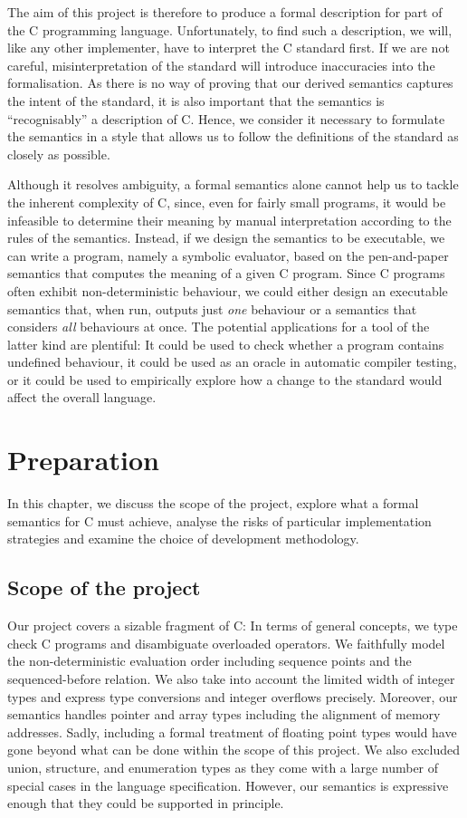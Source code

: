 \documentclass[a4paper,12pt]{scrbook}
\theoremstyle{plain}
\theoremstyle{definition}
\begin{document}
The aim of this project is therefore to produce a formal description for part of
the C programming language. Unfortunately, to find such a description, we will,
like any other implementer, have to interpret the C standard first. If we are
not careful, misinterpretation of the standard will introduce inaccuracies into
the formalisation. As there is no way of proving that our derived semantics
captures the intent of the standard, it is also important that the semantics is
``recognisably'' a description of C. Hence, we consider it necessary to
formulate the semantics in a style that allows us to follow the definitions of
the standard as closely as possible.

Although it resolves ambiguity, a formal semantics alone cannot help us to
tackle the inherent complexity of C, since, even for fairly small programs, it
would be infeasible to determine their meaning by manual interpretation
according to the rules of the semantics. Instead, if we design the semantics to
be executable, we can write a program, namely a symbolic evaluator, based on the
pen-and-paper semantics that computes the meaning of a given C program. Since C
programs often exhibit non-deterministic behaviour, we could either design an
executable semantics that, when run, outputs just \textit{one} behaviour or a
semantics that considers \textit{all} behaviours at once. The potential
applications for a tool of the latter kind are plentiful: It could be used to
check whether a program contains undefined behaviour, it could be used as an
oracle in automatic compiler testing, or it could be used to empirically explore
how a change to the standard would affect the overall language.

\chapter{Preparation}
In this chapter, we discuss the scope of the project, explore what a formal
semantics for C must achieve, analyse the risks of particular implementation
strategies and examine the choice of development methodology.

\section{Scope of the project}
Our project covers a sizable fragment of C: In terms of general concepts, we
type check C programs and disambiguate overloaded operators. We faithfully model
the non-deterministic evaluation order including sequence points and the
sequenced-before relation. We also take into account the limited width of
integer types and express type conversions and integer overflows
precisely. Moreover, our semantics handles pointer and array types including the
alignment of memory addresses. Sadly, including a formal treatment of floating
point types would have gone beyond what can be done within the scope of this
project. We also excluded union, structure, and enumeration types as they come
with a large number of special cases in the language specification. However, our
semantics is expressive enough that they could be supported in principle.
\end{document}
